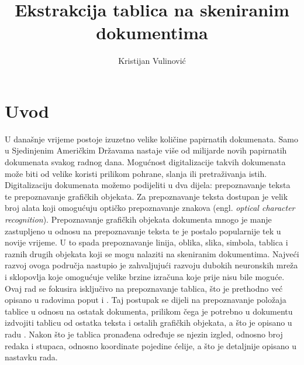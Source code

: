 \documentclass[times, utf8, zavrsni, numeric]{fer}
\begin{document}
\title{Ekstrakcija tablica na skeniranim dokumentima}
\author{Kristijan Vulinović}

\maketitle

\izvornik


\tableofcontents

\chapter{Uvod}
U današnje vrijeme postoje izuzetno velike količine papirnatih dokumenata.
Samo u Sjedinjenim Američkim Državama nastaje više od milijarde novih papirnatih dokumenata svakog radnog dana. 
Mogućnost digitalizacije takvih dokumenata može biti od velike koristi prilikom pohrane, slanja ili pretraživanja istih. \cite{article:Skew-detection}
Digitalizaciju dokumenata možemo podijeliti u dva dijela: prepoznavanje teksta te prepoznavanje grafičkih objekata. \cite{conference:DetectionOfTableStructure} 
Za prepoznavanje teksta dostupan je velik broj alata koji omogućuju optičko prepoznavanje znakova (engl. \textit{optical character recognition}).
Prepoznavanje grafičkih objekata dokumenta mnogo je manje zastupljeno u odnosu na prepoznavanje teksta te je postalo popularnije tek u novije vrijeme. 
U to spada prepoznavanje linija, oblika, slika, simbola, tablica i raznih drugih objekata koji se mogu nalaziti na skeniranim dokumentima.
Najveći razvoj ovoga područja nastupio je zahvaljujući razvoju dubokih neuronskih mreža i sklopovlja koje omogućuje velike brzine izračuna koje prije nisu bile moguće.\\

Ovaj rad se fokusira isključivo na prepoznavanje tablica, što je prethodno već opisano u radovima poput \cite{conference:DetectionOfTableStructure} i \cite{conference:AutomaticTableDetectionInDocumentImages}. 
Taj postupak se dijeli na prepoznavanje položaja tablice u odnosu na ostatak dokumenta, prilikom čega je potrebno u dokumentu izdvojiti tablicu od ostatka teksta i ostalih grafičkih objekata, a što je opisano u radu \cite{article:Medium-IndependentTableDetection}.
Nakon što je tablica pronađena određuje se njezin izgled, odnosno broj redaka i stupaca, odnosno koordinate pojedine ćelije, a što je detaljnije opisano u nastavku rada. \\
\end{document}
